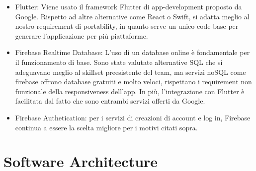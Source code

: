 \documentclass{article}
\begin{document}
\begin{itemize}
    \item Flutter: Viene usato il framework Flutter di app-development proposto da Google. Rispetto ad altre alternative come React o Swift, si adatta meglio al nostro requirement di portability, in quanto serve un unico code-base per generare l’applicazione per più piattaforme.  
    \item Firebase Realtime Database: L’uso di un database online è fondamentale per il funzionamento di base. Sono state valutate alternative SQL che si adeguavano meglio al skillset preesistente del team, ma servizi noSQL come firebase offrono database gratuiti e molto veloci, rispettano i requirement non funzionale della responsiveness dell’app. In più, l’integrazione con Flutter è facilitata dal fatto che sono entrambi servizi offerti da Google.
    \item Firebase Authetication: per i servizi di creazioni di account e log in, Firebase continua a essere la scelta migliore per i motivi citati sopra. 
    \end{itemize}

\newpage 
\section{Software Architecture}
\end{document}
